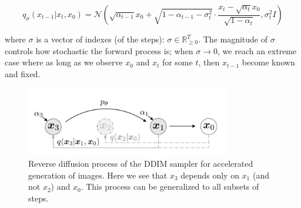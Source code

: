 \begin{equation*}
    q_\sigma (x_{t-1} | x_t, x_0) = \mathcal{N} (\sqrt{\alpha_{t-1}} x_0 + \sqrt{1 - \alpha_{t-1} - \sigma_t^2} \cdot \frac{x_t - \sqrt{\alpha_t} x_0}{\sqrt{1 - \alpha_t}}, \sigma_t^2 I)
\end{equation*}

where $\sigma$ is a vector of indexes (of the steps): $\sigma \in \mathbb{R}^T_{\geq 0}$. The magnitude of $\sigma$ controls how stochastic the forward process is; when $\sigma \rightarrow 0$, we reach an extreme case where as long as we observe $x_0$ and $x_t$ for some $t$, then $x_{t-1}$ become known and fixed.





\begin{figure}
    \centering
    \includegraphics[width=0.8\textwidth]{images/diffusion_models/stable_diffusion/ddim_sampling_process.png}
    \caption{Reverse diffusion process of the DDIM sampler \cite{ddim} for accelerated generation of images. Here we see that $x_3$ depends only on $x_1$ (and not $x_2$) and $x_0$. This process can be generalized to all subsets of steps.}
    \label{fig:ddim_sampling_process}
\end{figure}

